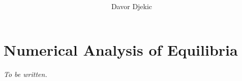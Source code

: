 \documentclass[12pt]{article}
\title{ }
\author{Davor Djekic}
\begin{document}
    \maketitle
    \newpage

    \tableofcontents


    
    
    
    
    \section{Numerical Analysis of Equilibria}
        \textit{To be written.}
    

    \listoffigures
    \listoftables
    \newpage
  
    \nocite{*}
    \printbibliography

\end{document}
